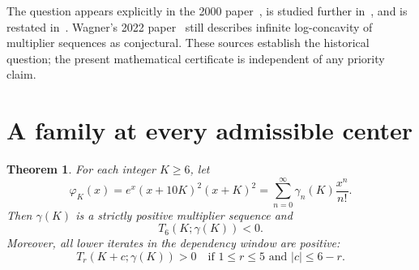 \documentclass[11pt]{article}
\newtheorem{theorem}{Theorem}
\begin{document}
The question appears explicitly in the 2000 paper~\cite{CD}, is studied
further in~\cite{CC}, and is restated in~\cite{B}. Wagner's 2022
paper~\cite[\S4.1]{W} still describes infinite log-concavity of multiplier
sequences as conjectural. These sources establish the historical question;
the present mathematical certificate is independent of any priority claim.

\section{A family at every admissible center}
\begin{theorem}\label{thm:family}
For each integer $K\ge6$, let
\[
\varphi_K(x)=e^x(x+10K)^2(x+K)^2
 =\sum_{n=0}^{\infty}\gamma_n(K)\frac{x^n}{n!}.
\]
Then $\gamma(K)$ is a strictly positive multiplier sequence and
\[
\boxed{T_6(K;\gamma(K))<0.}
\]
Moreover, all lower iterates in the dependency window are positive:
\[
T_r(K+c;\gamma(K))>0
\quad\text{if }1\le r\le5\text{ and }|c|\le6-r.
\]
\end{theorem}
\end{document}
